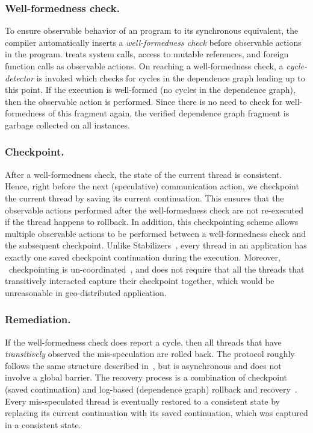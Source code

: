 \subsubsection{Well-formedness check.} To ensure observable behavior of an
\rxcml program to its synchronous equivalent, the compiler automatically
inserts a \emph{well-formedness check} before observable actions in the
program. \rxcml treats system calls, access to mutable references, and foreign
function calls as observable actions. On reaching a well-formedness check, a
\emph{cycle-detector} is invoked which checks for cycles in the dependence
graph leading up to this point. If the execution is well-formed (no cycles in
the dependence graph), then the observable action is performed. Since there is
no need to check for well-formedness of this fragment again, the verified
dependence graph fragment is garbage collected on all instances.


\subsubsection{Checkpoint.} After a well-formedness check, the state of the
current thread is consistent. Hence, right before the next (speculative)
communication action, we checkpoint the current thread by saving its current
continuation. This ensures that the observable actions performed after the
well-formedness check are not re-executed if the thread happens to rollback. In
addition, this checkpointing scheme allows multiple observable actions to be
performed between a well-formedness check and the subsequent checkpoint. Unlike
Stabilizers~\cite{Ziarek10}, every thread in an \rxcml application has exactly
one saved checkpoint continuation during the execution. Moreover, \rxcml\
checkpointing is un-coordinated~\cite{RollbackRecovery}, and does not require
that all the threads that transitively interacted capture their checkpoint
together, which would be unreasonable in geo-distributed application.

\subsubsection{Remediation.} If the well-formedness check does report a cycle,
then all threads that have \emph{transitively} observed the mis-speculation are
rolled back. The protocol roughly follows the same structure described
in~\cite{Ziarek10}, but is asynchronous and does not involve a global barrier.
The recovery process is a combination of checkpoint (saved continuation) and
log-based (dependence graph) rollback and recovery~\cite{RollbackRecovery}.
Every mis-speculated thread is eventually restored to a consistent state by
replacing its current continuation with its saved continuation, which was
captured in a consistent state.

